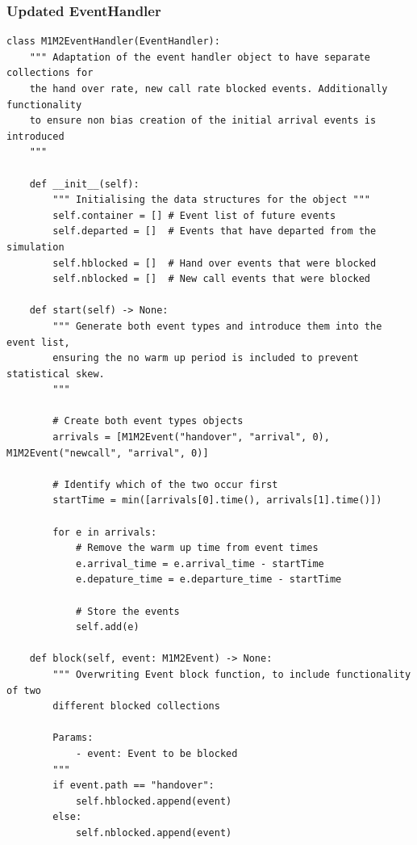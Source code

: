 \documentclass{ecmm427_assignment}
\begin{document}
\subsubsection{Updated EventHandler}
\begin{verbatim}
class M1M2EventHandler(EventHandler):
    """ Adaptation of the event handler object to have separate collections for
    the hand over rate, new call rate blocked events. Additionally functionality
    to ensure non bias creation of the initial arrival events is introduced
    """

    def __init__(self):
        """ Initialising the data structures for the object """
        self.container = [] # Event list of future events
        self.departed = []  # Events that have departed from the simulation
        self.hblocked = []  # Hand over events that were blocked
        self.nblocked = []  # New call events that were blocked

    def start(self) -> None:
        """ Generate both event types and introduce them into the event list,
        ensuring the no warm up period is included to prevent statistical skew.
        """

        # Create both event types objects
        arrivals = [M1M2Event("handover", "arrival", 0), M1M2Event("newcall", "arrival", 0)]

        # Identify which of the two occur first
        startTime = min([arrivals[0].time(), arrivals[1].time()])

        for e in arrivals:
            # Remove the warm up time from event times
            e.arrival_time = e.arrival_time - startTime
            e.depature_time = e.departure_time - startTime

            # Store the events
            self.add(e)

    def block(self, event: M1M2Event) -> None:
        """ Overwriting Event block function, to include functionality of two 
        different blocked collections

        Params:
            - event: Event to be blocked
        """
        if event.path == "handover":
            self.hblocked.append(event)
        else:
            self.nblocked.append(event)
\end{verbatim}
\end{document}

